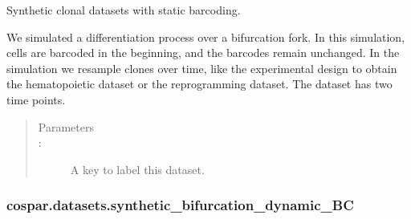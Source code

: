 \documentclass[letterpaper,10pt,english]{sphinxmanual}
\begin{document}
\begin{fulllineitems}
\label{\detokenize{cospar.datasets.synthetic_bifurcation_static_BC:cospar.datasets.synthetic_bifurcation_static_BC}}
Synthetic clonal datasets with static barcoding.

We simulated a differentiation process over a bifurcation fork. In this simulation,
cells are barcoded in the beginning, and the barcodes remain un\sphinxhyphen{}changed.
In the simulation we resample clones over time,
like the experimental design to obtain the hematopoietic dataset
or the reprogramming dataset. The dataset has two time points.
\begin{quote}\begin{description}
\item[{Parameters}] \leavevmode\item[{ : }] \leavevmode
A key to label this dataset.


\end{description}\end{quote}

\end{fulllineitems}



\subsubsection{cospar.datasets.synthetic\_bifurcation\_dynamic\_BC}
\label{\detokenize{cospar.datasets.synthetic_bifurcation_dynamic_BC:cospar-datasets-synthetic-bifurcation-dynamic-bc}}\label{\detokenize{cospar.datasets.synthetic_bifurcation_dynamic_BC::doc}}
\end{document}
